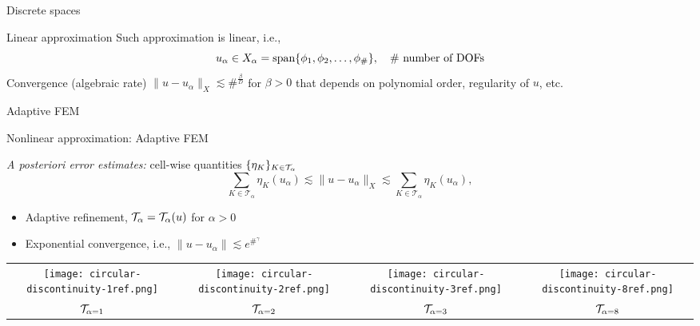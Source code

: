 \begin{frame}{Discrete spaces}
\begin{overprint}
  \begin{block}{Linear approximation}
    Such approximation is linear, i.e.,
    $$
    u_\alpha \in X_\alpha = {\rm span}\{ \phi_1, \phi_2, \ldots, \phi_{\#} \},
  \quad \# \hbox{ number of DOFs}
    $$
      Convergence (algebraic rate)
        $
        \| u - u_\alpha \|_{X} \lesssim \#^{\frac{\beta}{D}}
        $
         for $\beta > 0$ that depends on polynomial order, regularity of $u$, etc.
  \end{block}

  \end{overprint}



\end{frame}


\def\dofs{\boldsymbol{\xi}}
\def\A{\boldsymbol{\mathcal{A}}}
\def\J{\boldsymbol{\mathcal{J}}}



\begin{frame}{Adaptive FEM}

  \begin{block}{Nonlinear approximation: Adaptive FEM}

      \emph{A posteriori error estimates:} cell-wise quantities $\{\eta_K\}_{K \in \mathcal{T}_\alpha}$
    $$
    \sum_{K \in \mathcal{T}_\alpha} \eta_K(u_\alpha) \lesssim \| u - u_\alpha \|_{X} \lesssim \sum_{K \in \mathcal{T}_\alpha} \eta_K(u_\alpha),
    $$

    \begin{itemize}
  \item Adaptive refinement, $\mathcal{T}_\alpha = \mathcal{T}_\alpha(u)$ for $\alpha > 0$

  \item Exponential convergence, i.e., $\| u - u_\alpha \| \lesssim e^{\#^\gamma}$

  \end{itemize}
\end{block}


    \begin{tabular}{cccc}
      \texttt{[image: circular-discontinuity-1ref.png]}&
      \texttt{[image: circular-discontinuity-2ref.png]}&
      \texttt{[image: circular-discontinuity-3ref.png]}&
      \texttt{[image: circular-discontinuity-8ref.png]}\\
      $\mathcal{T}_{\alpha=1}$ &
      $\mathcal{T}_{\alpha=2}$ &
      $\mathcal{T}_{\alpha=3}$ &
      $\mathcal{T}_{\alpha=8}$
    \end{tabular}


\end{frame}


